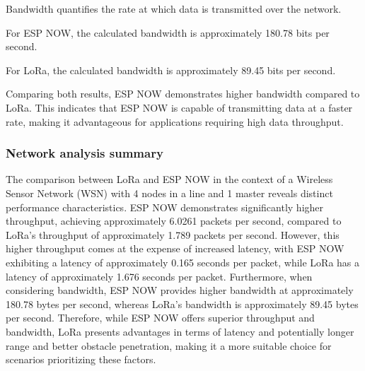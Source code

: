 Bandwidth quantifies the rate at which data is transmitted over the network.

For ESP NOW, the calculated bandwidth is approximately 180.78 bits per second.

For LoRa, the calculated bandwidth is approximately 89.45 bits per second.

Comparing both results, ESP NOW demonstrates higher bandwidth compared to LoRa. This indicates that ESP NOW is capable of transmitting data at a faster rate, making it advantageous for applications requiring high data throughput.

\subsubsection{Network analysis summary}

The comparison between LoRa and ESP NOW in the context of a Wireless Sensor Network (WSN) with 4 nodes in a line and 1 master reveals distinct performance characteristics. ESP NOW demonstrates significantly higher throughput, achieving approximately 6.0261 packets per second, compared to LoRa's throughput of approximately 1.789 packets per second. However, this higher throughput comes at the expense of increased latency, with ESP NOW exhibiting a latency of approximately 0.165 seconds per packet, while LoRa has a latency of approximately 1.676 seconds per packet. Furthermore, when considering bandwidth, ESP NOW provides higher bandwidth at approximately 180.78 bytes per second, whereas LoRa's bandwidth is approximately 89.45 bytes per second. Therefore, while ESP NOW offers superior throughput and bandwidth, LoRa presents advantages in terms of latency and potentially longer range and better obstacle penetration, making it a more suitable choice for scenarios prioritizing these factors.








